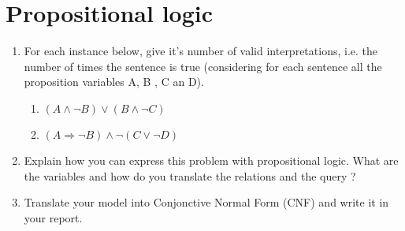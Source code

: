 \section{Propositional logic}
\begin{enumerate}
    \item For each instance below, give it's number of valid interpretations, i.e. the number of times the sentence is true (considering for each sentence all the proposition variables A, B , C an D).
    	\begin{enumerate}
    		\item $(A \wedge \lnot B) \vee (B \wedge \lnot C)$
    			\begin{framed}
    			\end{framed}
    		\item $(A \Rightarrow \lnot B) \wedge \lnot(C \vee \lnot D)$
    			\begin{framed}
    			\end{framed}
    	\end{enumerate}
    	
    \item Explain how you can express this problem with propositional logic. What are the variables and how do you translate the relations and the query ? 
    	\begin{framed}
    	\end{framed}
    
    \item Translate your model into Conjonctive Normal Form (CNF) and write it in your report.
    	\begin{framed}
    	\end{framed}
    
\end{enumerate}
